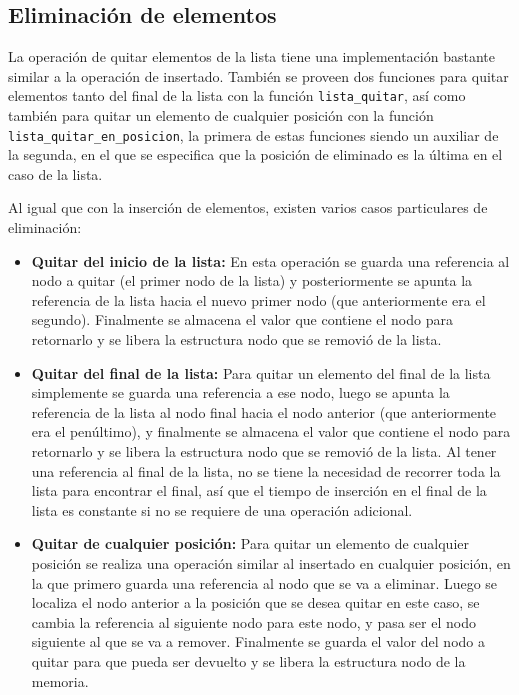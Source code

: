 \documentclass[titlepage,a4paper]{article}
\begin{document}
										 \subsection{Eliminación de elementos}

La operación de quitar elementos de la lista tiene una implementación bastante similar a la operación de insertado. También se proveen dos funciones para quitar elementos tanto del final de la lista con la función \lstinline{lista_quitar}, así como también para quitar un elemento de cualquier posición con la función \lstinline{lista_quitar_en_posicion}, la primera de estas funciones siendo un auxiliar de la segunda, en el que se especifica que la posición de eliminado es la última en el caso de la lista.

Al igual que con la inserción de elementos, existen varios casos particulares de eliminación:

\begin{itemize}
  \item \textbf{Quitar del inicio de la lista:} En esta operación se guarda una referencia al nodo a quitar (el primer nodo de la lista) y posteriormente se apunta la referencia de la lista hacia el nuevo primer nodo (que anteriormente era el segundo). Finalmente se almacena el valor que contiene el nodo para retornarlo y se libera la estructura nodo que se removió de la lista.
  \item \textbf{Quitar del final de la lista:} Para quitar un elemento del final de la lista simplemente se guarda una referencia a ese nodo, luego se apunta la referencia de la lista al nodo final hacia el nodo anterior (que anteriormente era el penúltimo), y finalmente se almacena el valor que contiene el nodo para retornarlo y se libera la estructura nodo que se removió de la lista. Al tener una referencia al final de la lista, no se tiene la necesidad de recorrer toda la lista para encontrar el final, así que el tiempo de inserción en el final de la lista es constante si no se requiere de una operación adicional.
  \item \textbf{Quitar de cualquier posición:} Para quitar un elemento de cualquier posición se realiza una operación similar al insertado en cualquier posición, en la que primero guarda una referencia al nodo que se va a eliminar. Luego se localiza el nodo anterior a la posición que se desea quitar en este caso, se cambia la referencia al siguiente nodo para este nodo, y pasa ser el nodo siguiente al que se va a remover. Finalmente se guarda el valor del nodo a quitar para que pueda ser devuelto y se libera la estructura nodo de la memoria.
\end{itemize}
\end{document}
